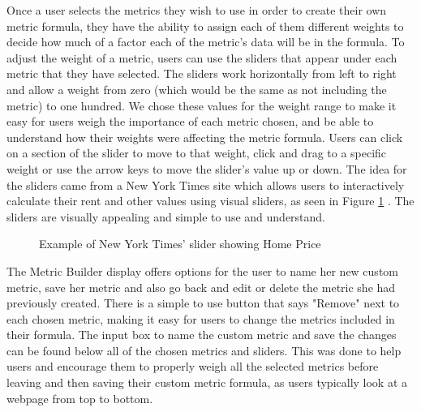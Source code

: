 			Once a user selects the metrics they wish to use in order to create their own metric formula, they have the ability to assign each of them different weights 
			to decide how much of a factor each of the metric's data will be in the formula. To adjust the weight of a metric, users can use the sliders that appear under 
			each metric that they have selected. The sliders work horizontally from left to right and allow a weight from zero (which would be the same as not including the metric) 
			to one hundred. We chose these values for the weight range to make it easy for users weigh the importance of each metric chosen, and be able to understand how their weights were affecting the metric formula. 
			Users can click on a section of the slider to move to that weight, click and drag to a specific weight or use the arrow keys to move the slider's value up or down. 
			The idea for the sliders came from a New York Times site which allows users to interactively calculate their rent and other values using visual sliders, as seen in Figure \ref{fig:slider} \cite{slider}. The sliders are 
			visually appealing and simple to use and understand.
			
			\begin{figure}[t]
				\centering
				\caption{Example of New York Times' slider showing Home Price}
				\label{fig:slider}
			\end{figure}
			
			
			The Metric Builder display offers options for the user to name her new custom metric, save her metric and also go back and edit or delete the metric she had previously created. There is a 
			simple to use button that says "Remove" next to each chosen metric, making it easy for users to change the metrics included in their formula. The input 
			box to name the custom metric and save the changes can be found below all of the chosen metrics and sliders. This was done to help users and encourage them to 
			properly weigh all the selected metrics before leaving and then saving their custom metric formula, as users typically look at a webpage from top to bottom.
		
